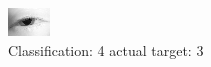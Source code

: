\begin{figure}[h!]
\begin{center}
\includegraphics[width=0.60\columnwidth]{figures/ID102_class_4_target_3.png}
\end{center}
\caption{ Classification: 4 actual target: 3}
\label{fig:ID102_class_4_target_3}
\end{figure}
